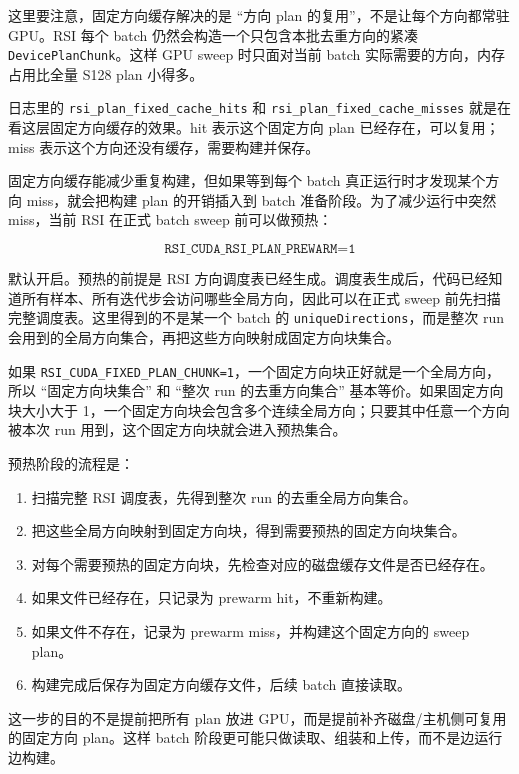 \documentclass[10pt]{article}
\newcommand{\subsect}[1]{\vspace{2mm}{\sffamily\large\bfseries #1}\par}
\newcommand{\code}[1]{\texttt{#1}}
\begin{document}
这里要注意，固定方向缓存解决的是 ``方向 plan 的复用''，不是让每个方向都常驻 GPU。RSI 每个 batch 仍然会构造一个只包含本批去重方向的紧凑 \code{DevicePlanChunk}。这样 GPU sweep 时只面对当前 batch 实际需要的方向，内存占用比全量 S128 plan 小得多。

日志里的 \code{rsi\_plan\_fixed\_cache\_hits} 和 \code{rsi\_plan\_fixed\_cache\_misses} 就是在看这层固定方向缓存的效果。hit 表示这个固定方向 plan 已经存在，可以复用；miss 表示这个方向还没有缓存，需要构建并保存。

\subsect{6.5 RSI 预热与并行加载}

固定方向缓存能减少重复构建，但如果等到每个 batch 真正运行时才发现某个方向 miss，就会把构建 plan 的开销插入到 batch 准备阶段。为了减少运行中突然 miss，当前 RSI 在正式 batch sweep 前可以做预热：

\[
\code{RSI\_CUDA\_RSI\_PLAN\_PREWARM=1}
\]

默认开启。预热的前提是 RSI 方向调度表已经生成。调度表生成后，代码已经知道所有样本、所有迭代步会访问哪些全局方向，因此可以在正式 sweep 前先扫描完整调度表。这里得到的不是某一个 batch 的 \code{uniqueDirections}，而是整次 run 会用到的全局方向集合，再把这些方向映射成固定方向块集合。

如果 \code{RSI\_CUDA\_FIXED\_PLAN\_CHUNK=1}，一个固定方向块正好就是一个全局方向，所以 ``固定方向块集合'' 和 ``整次 run 的去重方向集合'' 基本等价。如果固定方向块大小大于 1，一个固定方向块会包含多个连续全局方向；只要其中任意一个方向被本次 run 用到，这个固定方向块就会进入预热集合。

预热阶段的流程是：

\begin{enumerate}
\item 扫描完整 RSI 调度表，先得到整次 run 的去重全局方向集合。
\item 把这些全局方向映射到固定方向块，得到需要预热的固定方向块集合。
\item 对每个需要预热的固定方向块，先检查对应的磁盘缓存文件是否已经存在。
\item 如果文件已经存在，只记录为 prewarm hit，不重新构建。
\item 如果文件不存在，记录为 prewarm miss，并构建这个固定方向的 sweep plan。
\item 构建完成后保存为固定方向缓存文件，后续 batch 直接读取。
\end{enumerate}

这一步的目的不是提前把所有 plan 放进 GPU，而是提前补齐磁盘/主机侧可复用的固定方向 plan。这样 batch 阶段更可能只做读取、组装和上传，而不是边运行边构建。
\end{document}

